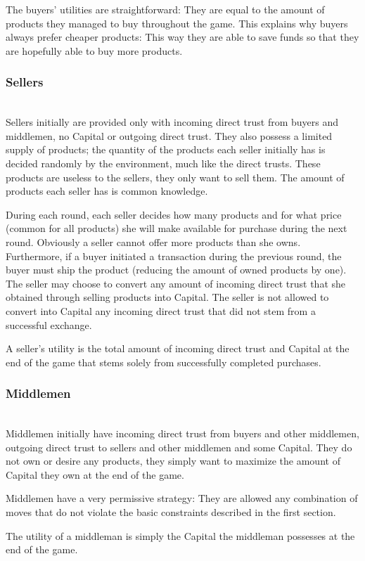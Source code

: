     The buyers' utilities are straightforward: They are equal to the amount of products they managed to buy throughout the
    game. This explains why buyers always prefer cheaper products: This way they are able to save funds so that they are
    hopefully able to buy more products.

  \subsubsection{Sellers} \ \\

    Sellers initially are provided only with incoming direct trust from buyers and middlemen, no Capital or outgoing direct
    trust. They also possess a limited supply of products; the quantity of the products each seller initially has is decided
    randomly by the environment, much like the direct trusts. These products are useless to the sellers, they only want to
    sell them. The amount of products each seller has is common knowledge.
    
    During each round, each seller decides how many products and for what price (common for all products) she will make
    available for purchase during the next round. Obviously a seller cannot offer more products than she owns. Furthermore, if
    a buyer initiated a transaction during the previous round, the buyer must ship the product (reducing the amount of owned
    products by one). The seller may choose to convert any amount of incoming direct trust that she obtained through selling
    products into Capital. The seller is not allowed to convert into Capital any incoming direct trust that did not stem from
    a successful exchange.

    A seller's utility is the total amount of incoming direct trust and Capital at the end of the game that stems solely from
    successfully completed purchases.

  \subsubsection{Middlemen} \ \\

    Middlemen initially have incoming direct trust from buyers and other middlemen, outgoing direct trust to sellers and other
    middlemen and some Capital. They do not own or desire any products, they simply want to maximize the amount of Capital
    they own at the end of the game.

    Middlemen have a very permissive strategy: They are allowed any combination of moves that do not violate the basic
    constraints described in the first section.

    The utility of a middleman is simply the Capital the middleman possesses at the end of the game.
